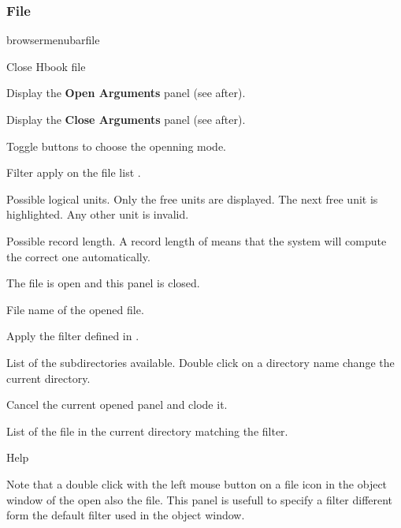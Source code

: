 
\subsubsection{File}

\begin{PAWf}{browsermenubarfile}
\begin{DLsf}{Close Hbook file}
\item[Open Hbook file]      Display the {\bf Open Arguments} panel (see after).
\item[Close Hbook file]     Display the {\bf Close Arguments} panel (see after).
\end{DLsf}
\end{PAWf}
\newpage

\newpage

\begin{EnumZW}
\item Toggle buttons to choose the openning mode.
\item Filter apply on the file list .
\item Possible logical units. Only the free units are displayed.
      The next free unit is highlighted. Any other unit is invalid. 
\item Possible record length. A record length of  means that the
      system will compute the correct one automatically.
\end{EnumZW}
\begin{EnumZB}
\item The file is open and this panel is closed.
\item File name of the opened file.
\item Apply the filter defined in .
\item List of the subdirectories available. Double click
      on a directory name change the current directory.
\item Cancel the current opened panel and clode it.
\item List of the file in the current directory matching
      the filter.
\item Help
\end{EnumZB}
Note that a double click with the left mouse button on a
\HBOOK{} file icon in the object window of the \MB{} open also 
the \HBOOK{} file.
This panel is usefull to specify a filter different form
the default filter  used in the object window.
\newpage

